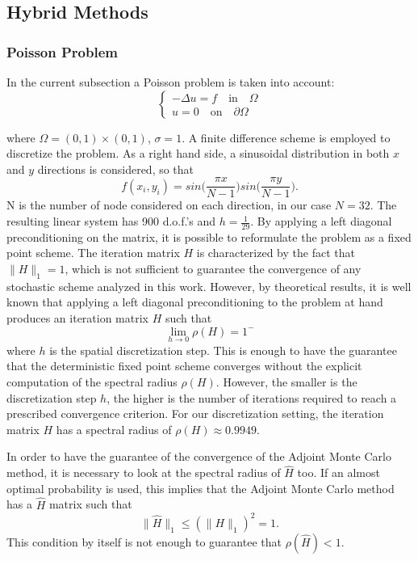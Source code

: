 \documentclass[a4paper,10pt]{article}
\begin{document}
\subsection{Hybrid Methods}

\subsubsection{Poisson Problem}

In the current subsection a Poisson problem is taken into account:
\begin{equation}
\begin{cases}
 -\Delta u = f \quad \text{in}\quad \Omega \\
 u=0\quad \text{on} \quad \partial\Omega
 \end{cases}
\end{equation}

where $\Omega=(0,1)\times (0,1)$, $\sigma=1$.
A finite difference scheme is employed to discretize the problem.
As a right hand side, a
sinusoidal distribution in both $x$ and $y$ directions is considered, so that
\[
 f(x_i, y_i)=sin\bigg(\frac{\pi x}{N-1}\bigg)sin\bigg(\frac{\pi y}{N-1}\bigg).
\]
N is the number of node considered on each direction, in our case $N=32$. The
resulting linear system has 900 d.o.f.'s and $h=\frac{1}{29}$.
By applying a left diagonal preconditioning on the matrix, it is possible to
reformulate the problem as a fixed point scheme.
The iteration matrix $H$ is characterized by the fact that $\lVert
H\rVert_1=1$, which is not sufficient to guarantee the convergence of
any
stochastic scheme analyzed in this work. However, by theoretical results, it is
well known that applying a left diagonal preconditioning to the problem at hand
produces an iteration matrix $H$ such that
\[
 \lim_{h\rightarrow 0}\rho(H)=1^{-}
\]
where $h$ is the spatial discretization step.
This is enough to have the guarantee that the deterministic fixed point scheme
converges without the explicit computation of the spectral radius $\rho(H)$.
However, the smaller is the discretization step $h$, the higher is the number of
iterations required to reach a prescribed convergence criterion. For our
discretization setting, the iteration matrix $H$ has a
spectral radius of $\rho(H)\approx 0.9949$.

In order to have the guarantee of the convergence of the Adjoint Monte Carlo
method, it is necessary to look at the spectral radius of $\hat{H}$ too. If an
almost optimal probability is used, this implies that
the Adjoint Monte Carlo method has a $\hat{H}$ matrix such that
\[
 \lVert \hat{H}\rVert_1\le (\rVert H\rVert_1)^2=1.
\]
This condition by itself is not enough to guarantee that
$\rho(\hat{H})<1$.
\end{document}
